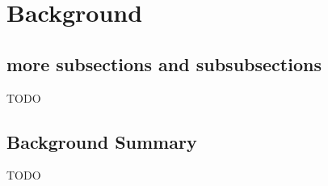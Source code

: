 
\chapter{Background}

\section{more subsections and subsubsections}
TODO
\section{Background Summary}
TODO






